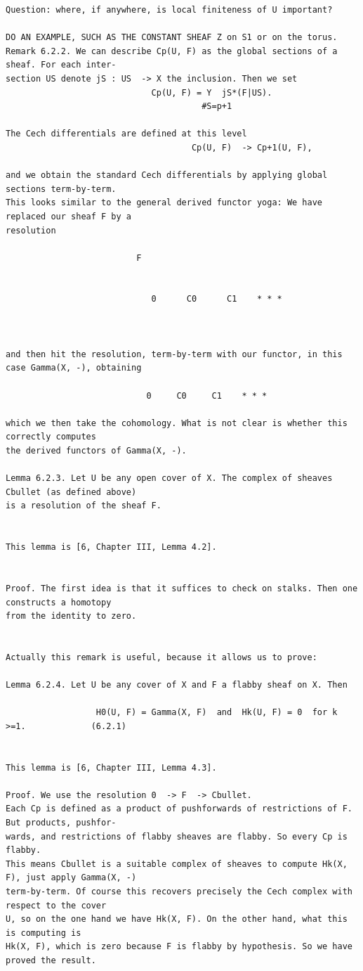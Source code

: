 \begin{Verbatim}[fontsize=\footnotesize]
Question: where, if anywhere, is local finiteness of U important?

DO AN EXAMPLE, SUCH AS THE CONSTANT SHEAF Z on S1 or on the torus.
Remark 6.2.2. We can describe Cp(U, F) as the global sections of a sheaf. For each inter-
section US denote jS : US  -> X the inclusion. Then we set
                             Cp(U, F) = Y  jS*(F|US).
                                       #S=p+1

The Cech differentials are defined at this level
                                     Cp(U, F)  -> Cp+1(U, F),

and we obtain the standard Cech differentials by applying global sections term-by-term.
This looks similar to the general derived functor yoga: We have replaced our sheaf F by a
resolution

                          F


                             0      C0      C1    * * *



and then hit the resolution, term-by-term with our functor, in this case Gamma(X, -), obtaining

                            0     C0     C1    * * *

which we then take the cohomology. What is not clear is whether this correctly computes
the derived functors of Gamma(X, -).

Lemma 6.2.3. Let U be any open cover of X. The complex of sheaves Cbullet (as defined above)
is a resolution of the sheaf F.


This lemma is [6, Chapter III, Lemma 4.2].


Proof. The first idea is that it suffices to check on stalks. Then one constructs a homotopy
from the identity to zero.


Actually this remark is useful, because it allows us to prove:

Lemma 6.2.4. Let U be any cover of X and F a flabby sheaf on X. Then

                  H0(U, F) = Gamma(X, F)  and  Hk(U, F) = 0  for k >=1.             (6.2.1)


This lemma is [6, Chapter III, Lemma 4.3].

Proof. We use the resolution 0  -> F  -> Cbullet.
Each Cp is defined as a product of pushforwards of restrictions of F. But products, pushfor-
wards, and restrictions of flabby sheaves are flabby. So every Cp is flabby.
This means Cbullet is a suitable complex of sheaves to compute Hk(X, F), just apply Gamma(X, -)
term-by-term. Of course this recovers precisely the Cech complex with respect to the cover
U, so on the one hand we have Hk(X, F). On the other hand, what this is computing is
Hk(X, F), which is zero because F is flabby by hypothesis. So we have proved the result.




\end{Verbatim}
